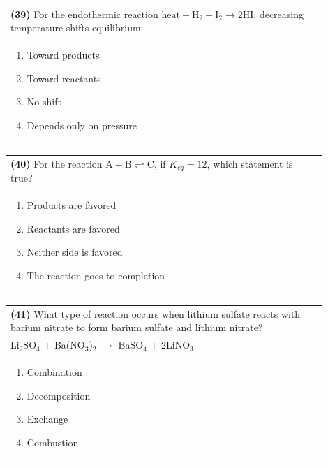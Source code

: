 \documentclass{article}
\begin{document}
\noindent\begin{tabular}{|p{0.9\linewidth}|}
\hline
\textbf{(39)} For the endothermic reaction $\text{heat} + \text{H}_2 + \text{I}_2 \rightarrow 2\text{HI}$, decreasing temperature shifts equilibrium: \\[0.2cm]
\begin{minipage}[t]{0.85\linewidth}
\begin{enumerate}[label=\alph*.]
\item Toward products
\item Toward reactants
\item No shift
\item Depends only on pressure
\end{enumerate}
\end{minipage}\\[0.2cm]
\hline
\end{tabular}

\noindent\begin{tabular}{|p{0.9\linewidth}|}
\hline
\textbf{(40)} For the reaction $\text{A} + \text{B} \rightleftharpoons \text{C}$, if $K_{eq} = 12$, which statement is true?\\[0.2cm]
\begin{minipage}[t]{0.85\linewidth}
\begin{enumerate}[label=\alph*.]
\item Products are favored
\item Reactants are favored
\item Neither side is favored
\item The reaction goes to completion
\end{enumerate}
\end{minipage}\\[0.2cm]
\hline
\end{tabular}
\newpage

\noindent\begin{tabular}{|p{0.9\linewidth}|}
\hline
\textbf{(41)} What type of reaction occurs when lithium sulfate reacts with barium nitrate to form barium sulfate and lithium nitrate?\\[0.2cm]
Li$_2$SO$_4$ + Ba(NO$_3$)$_2$ $\rightarrow$ BaSO$_4$ + 2LiNO$_3$\\[0.2cm]
\begin{minipage}[t]{0.85\linewidth}
\begin{enumerate}[label=\alph*.]
\item Combination
\item Decomposition
\item Exchange
\item Combustion
\end{enumerate}
\end{minipage}\\[0.2cm]
\hline
\end{tabular}
\end{document}
